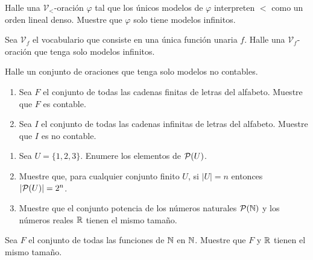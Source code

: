 \documentclass[12pt,a4paper]{book}
\newcommand{\VV}{\mathcal{V}}
\begin{document}
    \begin{ejercicio}
        Halle una $\VV_{<}$-oración $\varphi$ tal que los únicos modelos de $\varphi$ interpreten $<$ como un orden
        lineal denso. Muestre que $\varphi$ solo tiene modelos infinitos.
    \end{ejercicio}

    \begin{ejercicio}
        Sea $\VV_{f}$ el vocabulario que consiste en una única función unaria $f$. Halle una $\VV_{f}$-oración que
        tenga solo modelos infinitos.
    \end{ejercicio}

    \begin{ejercicio}
        Halle un conjunto de oraciones que tenga solo modelos no contables.
    \end{ejercicio}

    \begin{ejercicio}
        \begin{enumerate}[label=(\alph*)]
            \item Sea $F$ el conjunto de todas las cadenas finitas de letras del alfabeto. Muestre que $F$ es contable.
            \item Sea $I$ el conjunto de todas las cadenas infinitas de letras del alfabeto. Muestre que $I$ es no
            contable.
        \end{enumerate}
    \end{ejercicio}

    \begin{ejercicio}
        \begin{enumerate}[label=(\alph*)]
            \item Sea $U=\{1,2,3\}$. Enumere los elementos de $\mathcal{P}(U)$.
            \item Muestre que, para cualquier conjunto finito $U$, si $|U|=n$ entonces $|\mathcal{P}(U)|=2^{n}$.
            \item Muestre que el conjunto potencia de los números naturales $\mathcal{P}(\mathbb{N})$ y los números reales $\mathbb{R}$ tienen el
            mismo tamaño.
        \end{enumerate}
    \end{ejercicio}

    \begin{ejercicio}
        Sea $F$ el conjunto de todas las funciones de $\mathbb{N}$ en $\mathbb{N}$. Muestre que $F$ y $\mathbb{R}$ tienen el mismo tamaño.
    \end{ejercicio}
\end{document}
